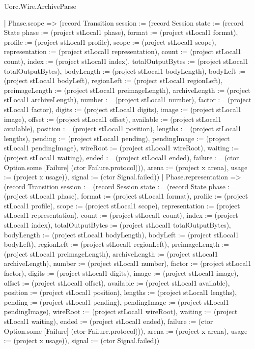 \begin{lexlean}{Uorc.Wire.ArchiveParse}
\begin{semanticmodule}
{    | Phase.scope => (record Transition {session := (record Session {state := (record State {phase := (project stLocal1 phase), format := (project stLocal1 format), profile := (project stLocal1 profile), scope := (project stLocal1 scope), representation := (project stLocal1 representation), count := (project stLocal1 count), index := (project stLocal1 index), totalOutputBytes := (project stLocal1 totalOutputBytes), bodyLength := (project stLocal1 bodyLength), bodyLeft := (project stLocal1 bodyLeft), regionLeft := (project stLocal1 regionLeft), preimageLength := (project stLocal1 preimageLength), archiveLength := (project stLocal1 archiveLength), number := (project stLocal1 number), factor := (project stLocal1 factor), digits := (project stLocal1 digits), image := (project stLocal1 image), offset := (project stLocal1 offset), available := (project stLocal1 available), position := (project stLocal1 position), lengths := (project stLocal1 lengths), pending := (project stLocal1 pending), pendingImage := (project stLocal1 pendingImage), wireRoot := (project stLocal1 wireRoot), waiting := (project stLocal1 waiting), ended := (project stLocal1 ended), failure := (ctor Option.some [Failure] (ctor Failure.protocol))}), arena := (project x arena), usage := (project x usage)}), signal := (ctor Signal.failed)})
    | Phase.representation => (record Transition {session := (record Session {state := (record State {phase := (project stLocal1 phase), format := (project stLocal1 format), profile := (project stLocal1 profile), scope := (project stLocal1 scope), representation := (project stLocal1 representation), count := (project stLocal1 count), index := (project stLocal1 index), totalOutputBytes := (project stLocal1 totalOutputBytes), bodyLength := (project stLocal1 bodyLength), bodyLeft := (project stLocal1 bodyLeft), regionLeft := (project stLocal1 regionLeft), preimageLength := (project stLocal1 preimageLength), archiveLength := (project stLocal1 archiveLength), number := (project stLocal1 number), factor := (project stLocal1 factor), digits := (project stLocal1 digits), image := (project stLocal1 image), offset := (project stLocal1 offset), available := (project stLocal1 available), position := (project stLocal1 position), lengths := (project stLocal1 lengths), pending := (project stLocal1 pending), pendingImage := (project stLocal1 pendingImage), wireRoot := (project stLocal1 wireRoot), waiting := (project stLocal1 waiting), ended := (project stLocal1 ended), failure := (ctor Option.some [Failure] (ctor Failure.protocol))}), arena := (project x arena), usage := (project x usage)}), signal := (ctor Signal.failed)})
}
\end{semanticmodule}
\end{lexlean}
